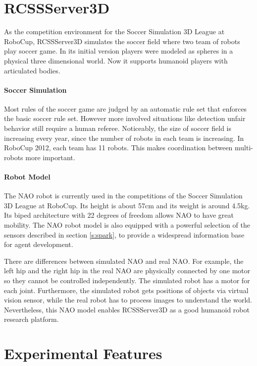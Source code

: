 \documentclass{llncs}
\begin{document}
\section{RCSSServer3D}
\label{s:rcssserver3d}

As the competition environment for the Soccer Simulation 3D League at RoboCup, 
RCSSServer3D simulates the soccer field where two team of robots play soccer game.
In its initial version players were modeled as spheres in a physical three dimensional world. Now it supports humanoid players with articulated bodies.

\paragraph{Soccer Simulation}
Most rules of the soccer game are judged by an automatic rule set that enforces the basic soccer rule set.
However more involved situations like detection unfair behavior still require a human referee.
Noticeably, the size of soccer field is increasing every year, since the number of robots in each team is increasing. In RoboCup 2012, each team has 11 robots.
This makes coordination between multi-robots more important.

\paragraph{Robot Model}
The NAO robot is currently used in the competitions of the Soccer Simulation 3D League at RoboCup. Its height is about 57cm and its weight is around 4.5kg.
Its biped architecture with 22 degrees of freedom allows NAO to have great mobility.
The NAO robot model is also equipped with a powerful selection of the
sensors described in section \ref{s:spark}, to provide a widespread information base for
agent development.

There are differences between simulated NAO and real NAO. For example, the left hip and the right hip in the real NAO are physically connected by one motor so they cannot be controlled independently. The simulated robot has a motor for each joint. Furthermore, the simulated robot gets positions of objects via virtual vision sensor, while the real robot has to process images to understand the world. Nevertheless, this NAO model enables RCSSServer3D as a good humanoid robot research platform.


\section{Experimental Features}
\label{s:ongoing}
\end{document}
